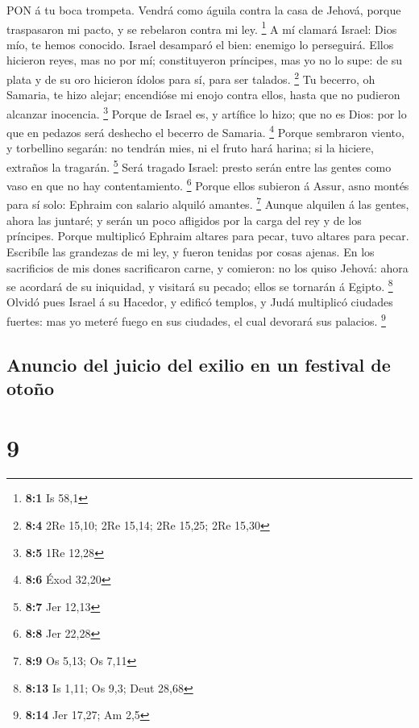  PON á tu boca trompeta. Vendrá como águila contra la casa
de Jehová, porque traspasaron mi pacto, y se rebelaron contra mi ley.
\footnote{\textbf{8:1} Is 58,1}  A mí clamará Israel: Dios
mío, te hemos conocido.  Israel desamparó el bien: enemigo
lo perseguirá.  Ellos hicieron reyes, mas no por mí;
constituyeron príncipes, mas yo no lo supe: de su plata y de su oro
hicieron ídolos para sí, para ser talados. \footnote{\textbf{8:4} 2Re
  15,10; 2Re 15,14; 2Re 15,25; 2Re 15,30}  Tu becerro, oh
Samaria, te hizo alejar; encendióse mi enojo contra ellos, hasta que no
pudieron alcanzar inocencia. \footnote{\textbf{8:5} 1Re 12,28}
 Porque de Israel es, y artífice lo hizo; que no es Dios:
por lo que en pedazos será deshecho el becerro de Samaria. \footnote{\textbf{8:6}
  Éxod 32,20}  Porque sembraron viento, y torbellino
segarán: no tendrán mies, ni el fruto hará harina; si la hiciere,
extraños la tragarán. \footnote{\textbf{8:7} Jer 12,13} 
Será tragado Israel: presto serán entre las gentes como vaso en que no
hay contentamiento. \footnote{\textbf{8:8} Jer 22,28} 
Porque ellos subieron á Assur, asno montés para sí solo: Ephraim con
salario alquiló amantes. \footnote{\textbf{8:9} Os 5,13; Os 7,11}
 Aunque alquilen á las gentes, ahora las juntaré; y serán
un poco afligidos por la carga del rey y de los príncipes. 
Porque multiplicó Ephraim altares para pecar, tuvo altares para pecar.
 Escribíle las grandezas de mi ley, y fueron tenidas por
cosas ajenas.  En los sacrificios de mis dones sacrificaron
carne, y comieron: no los quiso Jehová: ahora se acordará de su
iniquidad, y visitará su pecado; ellos se tornarán á Egipto. \footnote{\textbf{8:13}
  Is 1,11; Os 9,3; Deut 28,68}  Olvidó pues Israel á su
Hacedor, y edificó templos, y Judá multiplicó ciudades fuertes: mas yo
meteré fuego en sus ciudades, el cual devorará sus palacios. \footnote{\textbf{8:14}
  Jer 17,27; Am 2,5}

\hypertarget{anuncio-del-juicio-del-exilio-en-un-festival-de-otouxf1o}{%
\subsection{Anuncio del juicio del exilio en un festival de
otoño}\label{anuncio-del-juicio-del-exilio-en-un-festival-de-otouxf1o}}

\hypertarget{section-8}{%
\section{9}\label{section-8}}

